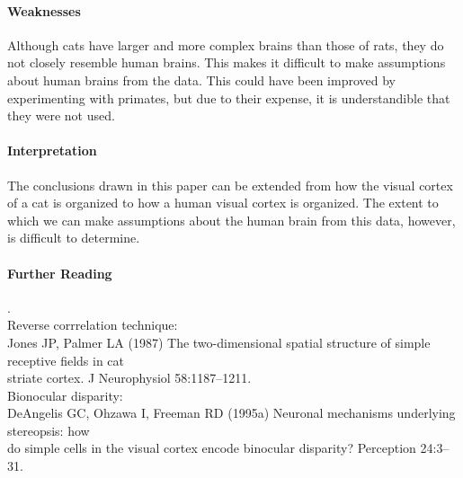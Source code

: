 \documentclass[11pt]{article}
\begin{document}
\paragraph{Weaknesses}
Although cats have larger and more complex brains than those of rats, they do not
closely resemble human brains.  This makes it difficult to make assumptions about
human brains from the data.  This could have been improved by experimenting with
primates, but due to their expense, it is understandible that they were not used. 

\paragraph{Interpretation}
The conclusions drawn in this paper can be extended from how the visual cortex of
a cat is organized to how a human visual cortex is organized.  The extent to which
we can make assumptions about the human brain from this data, however, is difficult
to determine.

\paragraph{Further Reading} \tiny{.}\\
\normalsize
Reverse corrrelation technique: \\
\hspace*{0.5in} Jones JP, Palmer LA (1987) The two-dimensional spatial structure of simple receptive fields in cat \\
\hspace*{0.5in} striate cortex. J Neurophysiol 58:1187–1211. \\
Bionocular disparity: \\
\hspace*{0.5in} DeAngelis GC, Ohzawa I, Freeman RD (1995a) Neuronal mechanisms underlying stereopsis: how \\
\hspace*{0.5in} do simple cells in the visual cortex encode binocular disparity? Perception 24:3–31.\\
\end{document}
